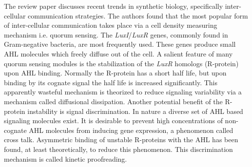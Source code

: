 \documentclass[float=false, crop=false]{standalone}
\begin{document}
	The review paper \cite{Pai2009} discusses recent trends in synthetic biology, specifically inter-cellular communication strategies. The authors found that the most popular form of inter-cellular communication takes place via a cell density measuring mechanism i.e. quorum sensing. The \textit{LuxI}/\textit{LuxR} genes, commonly found in Gram-negative bacteria, are most frequently used. These genes produce small AHL molecules which freely diffuse out of the cell. A salient feature of many quorum sensing modules is the stabilization of the \textit{LuxR} homologs (R-protein) upon AHL binding. Normally the R-protein has a short half life, but upon binding by its cognate signal the half life is increased significantly. This apparently wasteful mechanism is theorized to reduce signaling variability via a mechanism called diffusional dissipation. Another potential benefit of the R-protein instability is signal discrimination. In nature a diverse set of AHL based signaling molecules exist. It is desirable to prevent high concentrations of non-cognate AHL molecules from inducing gene expression, a phenomenon called cross talk. Asymmetric binding of unstable R-proteins with the AHL has been found, at least theoretically, to reduce this phenomenon. This discrimination mechanism is called kinetic proofreading.  

	\ifstandalone
			
		
	\fi
\end{document}
